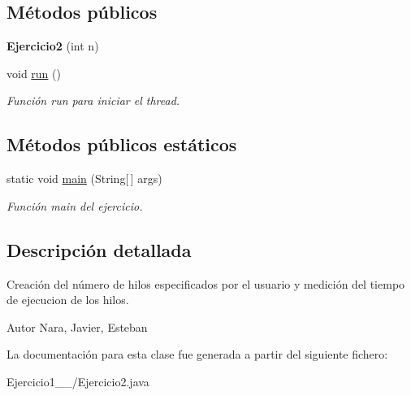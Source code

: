 \subsection*{Métodos públicos}
\begin{DoxyCompactItemize}
\item 
\hypertarget{class_ejercicio1__2__1_1_1_ejercicio2_aebfccde0e9e4f76521e85b253966a1aa}{}{\bfseries Ejercicio2} (int n)\label{class_ejercicio1__2__1_1_1_ejercicio2_aebfccde0e9e4f76521e85b253966a1aa}

\item 
\hypertarget{class_ejercicio1__2__1_1_1_ejercicio2_a2c66ccaa4198d9a0834977d21171a801}{}void \hyperlink{class_ejercicio1__2__1_1_1_ejercicio2_a2c66ccaa4198d9a0834977d21171a801}{run} ()\label{class_ejercicio1__2__1_1_1_ejercicio2_a2c66ccaa4198d9a0834977d21171a801}

\begin{DoxyCompactList}\small\item\em Función run para iniciar el thread. \end{DoxyCompactList}\end{DoxyCompactItemize}
\subsection*{Métodos públicos estáticos}
\begin{DoxyCompactItemize}
\item 
\hypertarget{class_ejercicio1__2__1_1_1_ejercicio2_a8b28d2e41a5e7e08e7024df7f8967b0b}{}static void \hyperlink{class_ejercicio1__2__1_1_1_ejercicio2_a8b28d2e41a5e7e08e7024df7f8967b0b}{main} (String\mbox{[}$\,$\mbox{]} args)\label{class_ejercicio1__2__1_1_1_ejercicio2_a8b28d2e41a5e7e08e7024df7f8967b0b}

\begin{DoxyCompactList}\small\item\em Función main del ejercicio. \end{DoxyCompactList}\end{DoxyCompactItemize}


\subsection{Descripción detallada}
Creación del número de hilos especificados por el usuario y medición del tiempo de ejecucion de los hilos. 

\begin{DoxyAuthor}{Autor}
Nara, Javier, Esteban 
\end{DoxyAuthor}


La documentación para esta clase fue generada a partir del siguiente fichero\+:\begin{DoxyCompactItemize}
\item 
Ejercicio1\+\_\+\_/Ejercicio2.\+java\end{DoxyCompactItemize}
